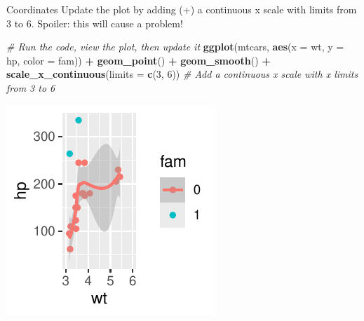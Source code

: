\documentclass[
  ignorenonframetext,
]{beamer}
\newenvironment{Shaded}{\begin{snugshade}}{\end{snugshade}}
\newcommand{\AttributeTok}[1]{\textcolor[rgb]{0.13,0.29,0.53}{#1}}
\newcommand{\CommentTok}[1]{\textcolor[rgb]{0.56,0.35,0.01}{\textit{#1}}}
\newcommand{\DecValTok}[1]{\textcolor[rgb]{0.00,0.00,0.81}{#1}}
\newcommand{\FunctionTok}[1]{\textcolor[rgb]{0.13,0.29,0.53}{\textbf{#1}}}
\newcommand{\NormalTok}[1]{#1}
\newcommand{\SpecialCharTok}[1]{\textcolor[rgb]{0.81,0.36,0.00}{\textbf{#1}}}
\begin{document}
\begin{frame}[fragile]{Coordinates}
\label{coordinates-7}
Update the plot by adding (+) a continuous x scale with limits from 3 to
6. Spoiler: this will cause a problem!


\begin{Shaded}
\begin{Highlighting}[]
\CommentTok{\# Run the code, view the plot, then update it}
\FunctionTok{ggplot}\NormalTok{(mtcars, }\FunctionTok{aes}\NormalTok{(}\AttributeTok{x =}\NormalTok{ wt, }\AttributeTok{y =}\NormalTok{ hp, }\AttributeTok{color =}\NormalTok{ fam)) }\SpecialCharTok{+} \FunctionTok{geom\_point}\NormalTok{() }\SpecialCharTok{+}
    \FunctionTok{geom\_smooth}\NormalTok{() }\SpecialCharTok{+} \FunctionTok{scale\_x\_continuous}\NormalTok{(}\AttributeTok{limits =} \FunctionTok{c}\NormalTok{(}\DecValTok{3}\NormalTok{, }\DecValTok{6}\NormalTok{))  }\CommentTok{\# Add a continuous x scale with x limits from 3 to 6}
\end{Highlighting}
\end{Shaded}

\begin{center}\includegraphics[width=0.5\linewidth]{Figs/unnamed-chunk-39-1} \end{center}
\end{frame}
\end{document}
